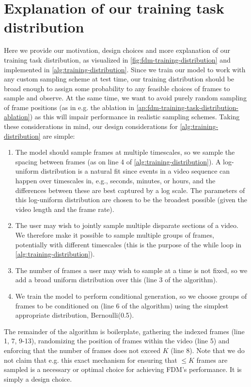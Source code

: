 \section{Explanation of our training task distribution} \label{app:training-task-dist-exp}
Here we provide our motivation, design choices and more explanation of our training task distribution, as visualized in \cref{fig:fdm-training-distribution} and implemented in \cref{alg:training-distribution}. Since we train our model to work with any custom sampling scheme at test time, our training distribution should be broad enough to assign some probability to any feasible choices of frames to sample and observe. At the same time, we want to avoid purely random sampling of frame positions (as in e.g. the ablation in \cref{ap:fdm-training-task-distribution-ablation}) as this will impair performance in realistic sampling schemes. Taking these considerations in mind, our design considerations for \cref{alg:training-distribution} are simple:
\begin{enumerate}
    \item The model should sample frames at multiple timescales, so we sample the spacing between frames (as on line 4 of \cref{alg:training-distribution}). A log-uniform distribution is a natural fit since events in a video sequence can happen over timescales in, e.g., seconds, minutes, or hours, and the differences between these are best captured by a log scale. The parameters of this log-uniform distribution are chosen to be the broadest possible (given the video length and the frame rate).
    \item The user may wish to jointly sample multiple disparate sections of a video. We therefore make it possible to sample multiple groups of frames, potentially with different timescales (this is the purpose of the while loop in \cref{alg:training-distribution}).
    \item The number of frames a user may wish to sample at a time is not fixed, so we add a broad uniform distribution over this (line 3 of the algorithm).
    \item We train the model to perform conditional generation, so we choose groups of frames to be conditioned on (line 6 of the algorithm) using the simplest appropriate distribution, Bernoulli(0.5).
\end{enumerate}
The remainder of the algorithm is boilerplate, gathering the indexed frames (line 1, 7, 9-13), randomizing the position of frames within the video (line 5) and enforcing that the number of frames does not exceed $K$ (line 8). Note that we do not claim that e.g. this exact mechanism for ensuring that $\leq K$ frames are sampled is a necessary or optimal choice for achieving FDM’s performance. It is simply a design choice.

